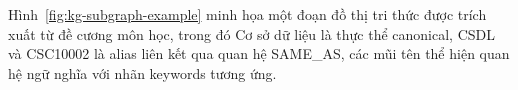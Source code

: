 Hình~\ref{fig:kg-subgraph-example} minh họa một đoạn đồ thị tri thức được
trích xuất từ đề cương môn học, trong đó Cơ sở dữ liệu là thực thể canonical,
CSDL và CSC10002 là alias liên kết qua quan hệ SAME\_AS,
các mũi tên thể hiện quan hệ ngữ nghĩa với nhãn keywords tương ứng.


